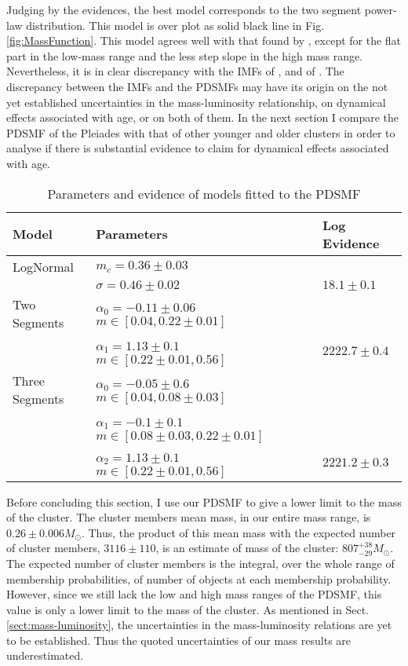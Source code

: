 Judging by the evidences, the best model corresponds to the two segment power-law distribution. This model is over plot as solid black line in Fig. \ref{fig:MassFunction}. This model agrees well with that found by \citet{Bouy2015}, except for the flat part in the low-mass range and the less step slope in the high mass range. Nevertheless, it is in clear discrepancy with the IMFs of \citet{Chabrier2005},  \cite[$m_c=0.25_{-0.016}^{+0.021}$ and $\sigma=0.55_{-0.01}^{+0.05}$, the uncertainties are those reported by][for single objects]{Chabrier2003} and of \citet{Thies2007}. The discrepancy between the IMFs and the PDSMFs \cite[][and ours]{Bouy2015} may have its origin on the not yet established uncertainties in the mass-luminosity relationship, on dynamical effects associated with age, or on both of them. In the next section I compare the PDSMF of the Pleiades with that of other younger and older clusters in order to analyse if there is substantial evidence to claim for dynamical effects associated with age.

\begin{table*}[ht!]
\caption{Parameters and evidence of models fitted to the PDSMF}
\begin{center}
\begin{tabular}{lll}
Model&Parameters& Log Evidence\\
\hline
LogNormal&$m_c=0.36\pm0.03$&\\
                 &$\sigma=0.46\pm0.02$ & $18.1 \pm 0.1$\\
\hline
Two Segments &$\alpha_0=-0.11\pm0.06$ \ \ $m \in [0.04,0.22\pm0.01]$ & \\ 
&  $\alpha_1=1.13\pm0.1$ \ \ $m \in [0.22\pm0.01,0.56]$&$2222.7\pm0.4$\\
\hline
Three Segments &$\alpha_0=-0.05\pm0.6$ \ \ $m \in [0.04,0.08\pm0.03]$ & \\
                          &$\alpha_1=-0.1\pm0.1$ \ \ $m \in [0.08\pm0.03,0.22\pm0.01]$ & \\ 
                          &$\alpha_2=1.13\pm0.1$ \ \ $m \in [0.22\pm0.01,0.56]$&$2221.2\pm 0.3$\\
\hline
\end{tabular}
\end{center}
\label{tab:fitPDSMF}
\end{table*}%

Before concluding this section, I use our PDSMF to give a lower limit to the mass of the cluster. The cluster members mean mass, in our entire mass range, is $0.26 \pm 0.006 M_{\odot}$. Thus, the product of this mean mass with the expected number of cluster members, $3116 \pm 110$, is an estimate of mass of the cluster: $807^{+38}_{-29} M_{\odot}$. The expected number of cluster members is the integral, over the whole range of membership probabilities, of number of objects at each membership probability. However, since we still lack the low and high mass ranges of the PDSMF, this value is only a lower limit to the mass of the cluster. As mentioned in Sect. \ref{sect:mass-luminosity}, the uncertainties in the mass-luminosity relations are yet to be established. Thus the quoted uncertainties of our mass results are underestimated.

